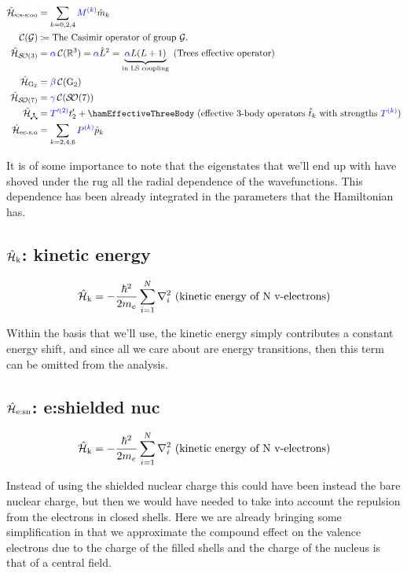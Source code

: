\documentclass{article}
\begin{document}
\begin{align}
	\hamSpinSpinSpinOtherOrbitSymbol &= \hamSpinSpinSpinOtherOrbit \\ 
	\nonumber \casimir{\anyGroup} &\DEF \text{The Casimir operator of group $\anyGroup$.}\\ 
	\hamTreesSymbol &= \casimirAlpha\casimir{\mathbb{R}^3} = \casimirAlpha \op{L}^2 = \underbrace{\casimirAlpha L (L+1)}_\text{in LS coupling} \text{ (Trees effective operator)} \\
	\hamGTwoSymbol      &= \casimirBeta\casimir{\text{G}_2} \\
	\hamSOSevenSymbol   &= \casimirGamma\casimir{\SO{7}} \\
	\ham_{\trispoke} &= {\opcolor{T'^{(2)}}}t'_2 + \hamEffectiveThreeBody \text{ (effective 3-body operators $\op{t}_k$ with strengths $\Tk{k}$)} \\
	\hamECSOSymbol &= \hamECSO
\end{align}

It is of some importance to note that the eigenstates that we'll end up with have shoved under the rug all the radial dependence of the wavefunctions. This dependence has been already integrated in the parameters that the Hamiltonian has. 

\subsection{$\hat{\mathcal{H}}_\text{k}$: kinetic energy}

\begin{equation}
    \hat{\mathcal{H}}_\text{k} = -\frac{\hbar^2}{2m_e}\sum_{i=1}^N \nabla_i^2 \text{ (kinetic energy of N v-electrons)}
\end{equation}

Within the basis that we'll use, the kinetic energy simply contributes a constant energy shift, and since all we care about are energy transitions, then this term can be omitted from the analysis.

\subsection{$\hat{\mathcal{H}}_\text{e:sn}$: e:shielded nuc}

\begin{equation}
\hat{\mathcal{H}}_\text{k} = -\frac{\hbar^2}{2m_e}\sum_{i=1}^N \nabla_i^2 \text{ (kinetic energy of N v-electrons)}
\end{equation}

Instead of using the shielded nuclear charge this could have been instead the bare nuclear charge, but then we would have needed to take into account the repulsion from the electrons in closed shells. Here we are already bringing some simplification in that we approximate the compound effect on the valence electrons due to the charge of the filled shells and the charge of the nucleus is that of a central field. 
\end{document}
